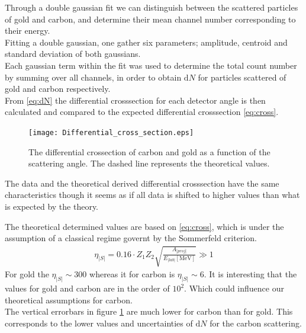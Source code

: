 Through a double gaussian fit we can distinguish between the scattered particles of gold and carbon, and determine their mean channel number corresponding to their energy.  \\
Fitting a double gaussian, one gather six parameters; amplitude, centroid and standard deviation
of both gaussians.  \\


 
Each gaussian term within the fit was used to determine the total count number by summing over all channels, in order to obtain $\mathrm{d}N$ for particles scattered of gold and carbon respectively.\\

From \cref{eq:dN} the differential crosssection for each detector angle is then calculated and compared to the expected differential crosssection \cref{eq:cross}.

\begin{figure}[h]
	\centering
		\texttt{[image: Differential\_cross\_section.eps]}
	\caption{The differential crossection  of carbon and gold as a function of the scattering angle. The dashed line represents the theoretical values.}
	\label{fig:Differential_cross_section}
\end{figure}
The data and the theoretical derived differential crosssection have the same characteristics though it seems as if all data is shifted to higher values than what is expected by the theory. 

The theoretical determined values are based on \cref{eq:cross}, which is under the assumption of a classical regime governt by the Sommerfeld criterion\parencite[p. 14]{noteBB}.
\begin{align}\label{eq:som}
\eta_|S|=0.16\cdot Z_1Z_2\sqrt{\frac{A_|proj|}{E_|lab|[\si{\mega\electronvolt}]}}\gg 1
\end{align}
For gold the $\eta_|S|\sim 300$ whereas it for carbon is $\eta_|S|\sim 6$. 
It is interesting that the values for gold and carbon are in the order of $10^2$. Which could influence our theoretical assumptions for carbon.   \\

The vertical errorbars in figure \cref{fig:Differential_cross_section} are much lower for carbon than for gold. This corresponds to the lower values and uncertainties of $\mathrm{d}N$ for the carbon scattering. 

